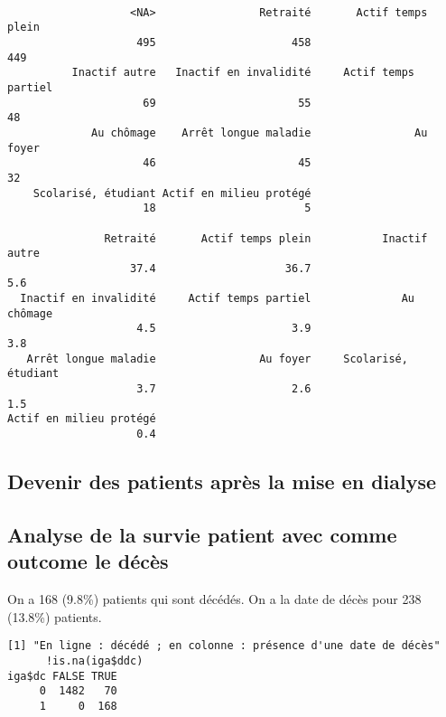 \documentclass[11pt,a4paper]{article}\usepackage[]{graphicx}\usepackage[]{color}
\makeatletter
\newenvironment{kframe}{%
 \def\at@end@of@kframe{}%
 \ifinner\ifhmode%
  \def\at@end@of@kframe{\end{minipage}}%
  \begin{minipage}{\columnwidth}%
 \fi\fi%
 \def\FrameCommand##1{\hskip\@totalleftmargin \hskip-\fboxsep
 \colorbox{shadecolor}{##1}\hskip-\fboxsep
     \hskip-\linewidth \hskip-\@totalleftmargin \hskip\columnwidth}%
 \MakeFramed {\advance\hsize-\width
   \@totalleftmargin\z@ \linewidth\hsize
   \@setminipage}}%
 {\par\unskip\endMakeFramed%
 \at@end@of@kframe}
\newenvironment{knitrout}{}{} %
\makeatother
\begin{document}
\begin{knitrout}
\color{fgcolor}\begin{kframe}
\begin{verbatim}

                   <NA>                Retraité       Actif temps plein 
                    495                     458                     449 
          Inactif autre   Inactif en invalidité     Actif temps partiel 
                     69                      55                      48 
             Au chômage    Arrêt longue maladie                Au foyer 
                     46                      45                      32 
    Scolarisé, étudiant Actif en milieu protégé 
                     18                       5 

               Retraité       Actif temps plein           Inactif autre 
                   37.4                    36.7                     5.6 
  Inactif en invalidité     Actif temps partiel              Au chômage 
                    4.5                     3.9                     3.8 
   Arrêt longue maladie                Au foyer     Scolarisé, étudiant 
                    3.7                     2.6                     1.5 
Actif en milieu protégé 
                    0.4 
\end{verbatim}
\end{kframe}
\end{knitrout}

  \subsection{Devenir des patients après la mise en dialyse}
  
  \subsection{Analyse de la survie patient avec comme outcome le décès}
  
  On a 168 (9.8\%) patients qui sont décédés. On a la date de décès pour 238 (13.8\%) patients.

\begin{knitrout}
\color{fgcolor}\begin{kframe}
\begin{verbatim}
[1] "En ligne : décédé ; en colonne : présence d'une date de décès"
      !is.na(iga$ddc)
iga$dc FALSE TRUE
     0  1482   70
     1     0  168
\end{verbatim}
\end{kframe}
\end{knitrout}
\end{document}
